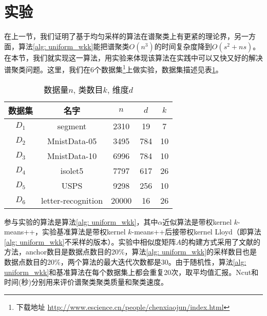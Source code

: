 \section{实验}
在上一节，我们证明了基于均匀采样的算法在谱聚类上有更紧的理论界，另一方面，算法\ref{alg: uniform_wkk}能把谱聚类$O(n^3)$的时间复杂度降到$O(s^2+ns)$。在本节，我们就实现这一算法，用实验来体现该算法在实践中可以又快又好的解决谱聚类问题。这里，我们在6个数据集\footnote{下载地址 \url{http://www.escience.cn/people/chenxiaojun/index.html}}上做实验，数据集描述见表\ref{tab:datasets_spectral_clustering}。
\begin{table}[h]
	\caption{数据量$n$, 类数目$k$, 维度$d$}
	\label{tab:datasets_spectral_clustering}
	\begin{tabular}{ccccc}
		\toprule
		数据集 & 名字 & $n$ & $d$ & $k$ \\
		\midrule
		$D_1$ & segment &2310 & 19 & 7 \\
		$D_2$ & MnistData-05 &3495 &784 & 10 \\
		$D_3$ & MnistData-10 &6996 & 784 & 10 \\
		$D_4$ & isolet5 &7797 & 617 & 26 \\
		$D_5$ & USPS &9298 & 256 & 10 \\
		$D_6$ & letter-recognition &20000 & 16 & 26 \\
		\bottomrule
	\end{tabular}
\end{table}

参与实验的算法是算法\ref{alg: uniform_wkk}，其中$\alpha$近似算法是带权kernel $k$-means++，实验基准算法是带权kernel $k$-means++后接带权kernel Lloyd（即算法\ref{alg: uniform_wkk}不采样的版本）。实验中相似度矩阵$A$的构建方式采用了文献\cite{chen2017scalable}的方法，anchor数目是数据点数目的20\%，算法\ref{alg: uniform_wkk}的采样数目也是数据点数目的20\%，两个算法的最大迭代次数都是30。由于随机性，算法\ref{alg: uniform_wkk}和基准算法在每个数据集上都会重复20次，取平均值汇报。Ncut和时间(秒)分别用来评价谱聚类聚类质量和聚类速度。

